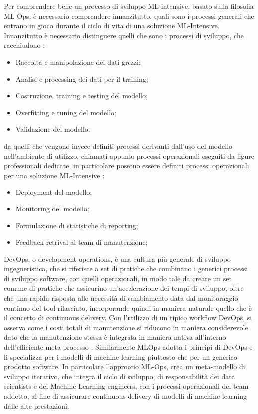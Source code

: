 Per comprendere bene un processo di sviluppo ML-intensive, basato sulla filosofia ML-Ops, è necessario comprendere innanzitutto, quali sono i processi generali che entrano in gioco durante il ciclo di vita di una soluzione ML-Intensive. Innanzitutto è necessario distinguere quelli che sono i processi di sviluppo, che racchiudono \cite{MLOpsBook}:

\begin{itemize}
    \item Raccolta e manipolazione dei dati grezzi;
    \item Analisi e processing dei dati per il training;
    \item Costruzione, training e testing del modello;
    \item Overfitting e tuning del modello;
    \item Validazione del modello.
    
\end{itemize}

da quelli che vengono invece definiti processi derivanti dall'uso del modello nell'ambiente di utilizzo, chiamati appunto processi operazionali eseguiti da figure professionali dedicate, in particolare possono essere definiti processi operazionali per una soluzione ML-Intensive \cite{MLOpsBook}:

\begin{itemize}
    \item Deployment del modello;
    \item Monitoring del modello;
    \item Formulazione di statistiche di reporting;
    \item Feedback retrival al team di manutenzione;
\end{itemize}

DevOps, o development operations, è una cultura più generale di sviluppo ingegneristica, che si riferisce a set di pratiche che combinano i generici processi di sviluppo software, con quelli operazionali, in modo tale da creare un set comune di pratiche che assicurino un'accelerazione dei tempi di sviluppo, oltre che una rapida risposta alle necessità di cambiamento data dal monitoraggio continuo del tool rilasciato, incorporando quindi in maniera naturale quello che è il concetto di continuous delivery\cite{MLOpsBook}. Con l'utilizzo di un tipico workflow DevOps, si osserva come i costi totali di manutenzione si riducono in maniera considerevole dato che la manutenzione stessa è integrata in maniera nativa all'interno dell'efficiente meta-processo \cite{MLOpsBook}. Similarmente MLOps adotta i principi di DevOps e li specializza per i modelli di machine learning piuttosto che per un generico prodotto software. In particolare l'approccio ML-Ops, crea un meta-modello di sviluppo iterativo, che integra il ciclo di sviluppo, di responsabilità dei data scientists e dei Machine Learning engineers, con i processi operazionali del team addetto, al fine di assicurare continuous delivery di modelli di machine learning dalle alte prestazioni\cite{MLOpsBook}.

